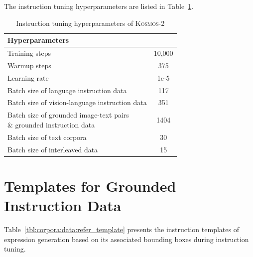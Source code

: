 \documentclass{article}
\newcommand\our{\textsc{Kosmos-2}}
\begin{document}
The instruction tuning hyperparameters are listed in Table~\ref{tbl:hyperparam:vl:instruct:opt}.
\label{app:hyperparam:inst}

\begin{table}[ht]
\centering
\small
\begin{tabular}{lc}
\toprule
\textbf{Hyperparameters} & \\ \midrule
Training steps                     &       10,000 \\
Warmup steps                      &       375 \\
Learning rate & 1e-5 \\
Batch size of language instruction data     &   117     \\
Batch size of vision-language instruction data  &  351      \\
\tabincell{l}{Batch size of grounded image-text pairs \\ \quad \& grounded instruction data}   &    1404    \\
Batch size of text corpora         &    30    \\
Batch size of interleaved data   &     15     \\

\bottomrule
\end{tabular}
\vspace{0.2cm}
\caption{Instruction tuning hyperparameters of \our{}}
\label{tbl:hyperparam:vl:instruct:opt}
\end{table}

\section{Templates for Grounded Instruction Data}
\label{app:corpora:data:refer_template}

Table~\ref{tbl:corpora:data:refer_template} presents the instruction templates of expression generation based on its associated bounding boxes during instruction tuning.
\end{document}

